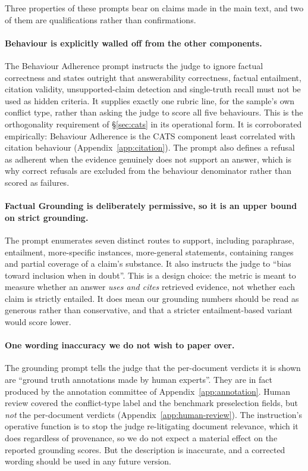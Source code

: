 Three properties of these prompts bear on claims made in the main text, and two
of them are qualifications rather than confirmations.

\paragraph{Behaviour is explicitly walled off from the other components.} The
Behaviour Adherence prompt instructs the judge to ignore factual correctness and
states outright that answerability correctness, factual entailment, citation
validity, unsupported-claim detection and single-truth recall must not be used as
hidden criteria. It supplies exactly one rubric line, for the sample's own
conflict type, rather than asking the judge to score all five behaviours. This is
the orthogonality requirement of \S\ref{sec:cats} in its operational form. It
is corroborated empirically: Behaviour Adherence is the CATS component least
correlated with citation behaviour (Appendix~\ref{app:citation}). The prompt also
defines a refusal as adherent when the evidence genuinely does not support an
answer, which is why correct refusals are excluded from the behaviour denominator
rather than scored as failures.

\paragraph{Factual Grounding is deliberately permissive, so it is an upper bound
on strict grounding.} The prompt enumerates seven distinct routes to support,
including paraphrase, entailment, more-specific instances, more-general
statements, containing ranges and partial coverage of a claim's substance. It also
instructs the judge to ``bias toward inclusion when in doubt''. This is a design
choice: the metric is meant to measure whether an answer \emph{uses and cites}
retrieved evidence, not whether each claim is strictly entailed. It does mean our
grounding numbers should be read as generous rather than conservative, and that a
stricter entailment-based variant would score lower.

\paragraph{One wording inaccuracy we do not wish to paper over.} The grounding
prompt tells the judge that the per-document verdicts it is shown are ``ground
truth annotations made by human experts''. They are in fact produced by the
annotation committee of Appendix~\ref{app:annotation}. Human review covered the
conflict-type label and the benchmark preselection fields, but \emph{not} the
per-document verdicts (Appendix~\ref{app:human-review}). The instruction's
operative function is to stop the judge re-litigating document relevance, which it
does regardless of provenance, so we do not expect a material effect on the
reported grounding scores. But the description is inaccurate, and a corrected
wording should be used in any future version.

